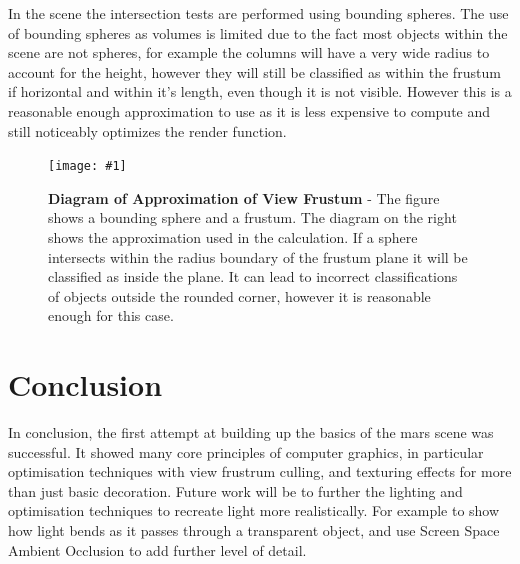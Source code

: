 \documentclass[conference]{acmsiggraph}
\newcommand{\figuremacroW}[4]{
\begin{figure}[h] %
	\centering
	\texttt{[image: \#1]}
	\caption[#2]{\textbf{#2} - #3}
	\label{fig:#1}
\end{figure}
}
\begin{document}
In the scene the intersection tests are performed using bounding spheres. The use of bounding spheres as volumes is limited due to the fact most objects within the scene are not spheres, for example the columns will have a very wide radius to account for the height, however they will still be classified as within the frustum if horizontal and within it's length, even though it is not visible. However this is a reasonable enough approximation to use as it is less expensive to compute and still noticeably optimizes the render function.

\figuremacroW
{approxFrustum}
{Diagram of Approximation of View Frustum}
{The figure shows a bounding sphere and a frustum. The diagram on the right shows the approximation used in the calculation. If a sphere intersects within the radius boundary of the frustum plane it will be classified as inside the plane. It can lead to incorrect classifications of objects outside the rounded corner, however it is reasonable enough for this case. \cite{RTR}}
{1.0}

	
\section{Conclusion}
In conclusion, the first attempt at building up the basics of the mars scene was successful. It showed many core principles of computer graphics, in particular optimisation techniques with view frustrum culling, and texturing effects for more than just basic decoration. Future work will be to further the lighting and optimisation techniques to recreate light more realistically. For example to show how light bends as it passes through a transparent object, and use Screen Space Ambient Occlusion to add further level of detail.


	
	
\end{document}
